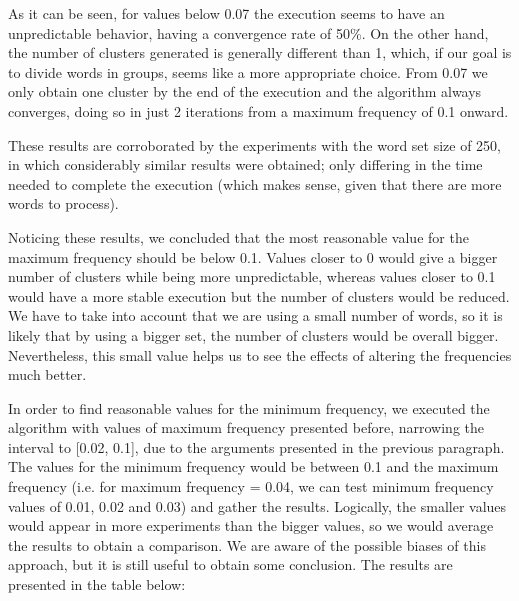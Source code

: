 As it can be seen, for values below 0.07 the execution seems to have an unpredictable behavior, having a convergence rate of 50\%. On the other hand, the number of clusters generated is generally different than 1, which, if our goal is to divide words in groups, seems like a more appropriate choice. From 0.07 we only obtain one cluster by the end of the execution and the algorithm always converges, doing so in just 2 iterations from a maximum frequency of 0.1 onward.

These results are corroborated by the experiments with the word set size of 250, in which considerably similar results were obtained; only differing in the time needed to complete the execution (which makes sense, given that there are more words to process).

Noticing these results, we concluded that the most reasonable value for the maximum frequency should be below 0.1. Values closer to 0 would give a bigger number of clusters while being more unpredictable, whereas values closer to 0.1 would have a more stable execution but the number of clusters would be reduced. We have to take into account that we are using a small number of words, so it is likely that by using a bigger set, the number of clusters would be overall bigger. Nevertheless, this small value helps us to see the effects of altering the frequencies much better.

In order to find reasonable values for the minimum frequency, we executed the algorithm with values of maximum frequency presented before, narrowing the interval to [0.02, 0.1], due to the arguments presented in the previous paragraph. The values for the minimum frequency would be between 0.1 and the maximum frequency (i.e. for maximum frequency = 0.04, we can test minimum frequency values of 0.01, 0.02 and 0.03) and gather the results. Logically, the smaller values would appear in more experiments than the bigger values, so we would average the results to obtain a comparison. We are aware of the possible biases of this approach, but it is still useful to obtain some conclusion. The results are presented in the table below:


